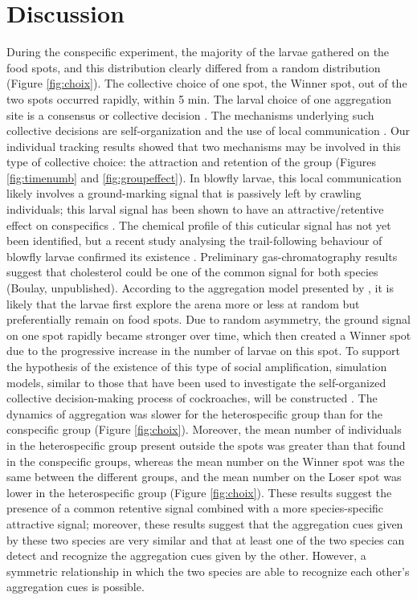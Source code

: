 \clearpage
	\section{Discussion}
During the conspecific experiment, the majority of the larvae gathered on the food spots, and this distribution clearly differed from a random distribution (Figure \ref{fig:choix}). The collective choice of one spot, the Winner spot, out of the two spots occurred rapidly, within 5 min. The larval choice of one aggregation site is a consensus or collective decision \citep{deneubourg_dynamics_2002,conradt_consensus_2005}. The mechanisms underlying such collective decisions are self-organization and the use of local communication \cite{camazine_self-organization_2001}. Our individual tracking results showed that two mechanisms may be involved in this type of collective choice: the attraction and retention of the group (Figures \ref{fig:timenumb} and \ref{fig:groupeffect}). In blowfly larvae, this local communication likely involves a ground-marking signal that is passively left by crawling individuals; this larval signal has been shown to have an attractive/retentive effect on conspecifics \cite{boulay_evidence_2013}. The chemical profile of this cuticular signal has not yet been identified, but a recent study analysing the trail-following behaviour of blowfly larvae confirmed its existence \cite{boulay_first_2015}. Preliminary gas-chromatography results suggest that cholesterol could be one of the common signal for both species (Boulay, unpublished). According to the aggregation model presented by \citet{ame_collegial_2006}, it is likely that the larvae first explore the arena more or less at random but preferentially remain on food spots. Due to random asymmetry, the ground signal on one spot rapidly became stronger over time, which then created a Winner spot due to the progressive increase in the number of larvae on this spot. To support the hypothesis of the existence of this type of social amplification, simulation models, similar to those that have been used to investigate the self-organized collective decision-making process of cockroaches, will be constructed \cite{ame_collegial_2006}. The dynamics of aggregation was slower for the heterospecific group than for the conspecific group (Figure \ref{fig:choix}). Moreover, the mean number of individuals in the heterospecific group present outside the spots was greater than that found in the conspecific groups, whereas the mean number on the Winner spot was the same between the different groups, and the mean number on the Loser spot was lower in the heterospecific group (Figure \ref{fig:choix}). These results suggest the presence of a common retentive signal combined with a more species-specific attractive signal; moreover, these results suggest that the aggregation cues given by these two species are very similar and that at least one of the two species can detect and recognize the aggregation cues given by the other. However, a symmetric relationship in which the two species are able to recognize each other’s aggregation cues is possible.

